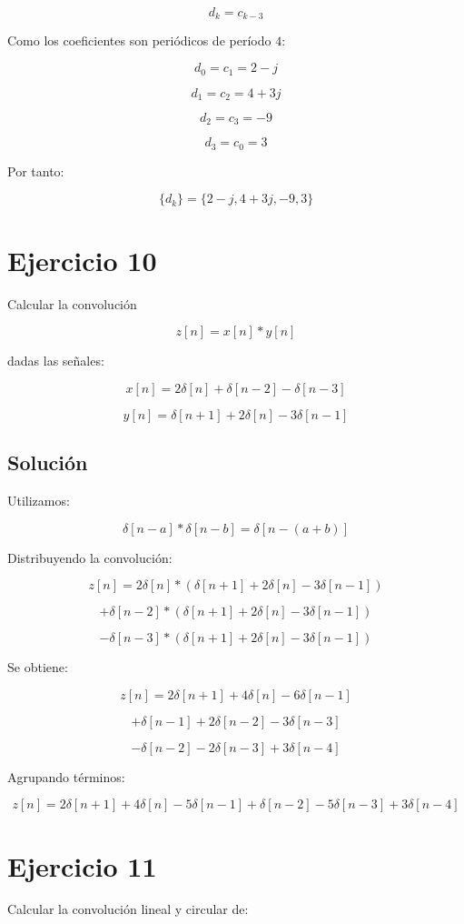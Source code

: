 \documentclass[fleqn]{article}
\begin{document}
	\[
	d_k=c_{k-3}
	\]

	Como los coeficientes son periódicos de período $4$:

	\[
	d_0=c_1=2-j
	\]

	\[
	d_1=c_2=4+3j
	\]

	\[
	d_2=c_3=-9
	\]

	\[
	d_3=c_0=3
	\]

	Por tanto:

	\[
	\boxed{
	\{d_k\}
	=
	\{2-j,4+3j,-9,3\}
	}
	\]

\section{Ejercicio 10}
	Calcular la convolución

	\[
	z[n]=x[n]*y[n]
	\]

	dadas las señales:

	\[
	x[n]
	=
	2\delta[n]
	+
	\delta[n-2]
	-
	\delta[n-3]
	\]

	\[
	y[n]
	=
	\delta[n+1]
	+
	2\delta[n]
	-
	3\delta[n-1]
	\]

	\subsection{Solución}

	Utilizamos:

	\[
	\delta[n-a]*\delta[n-b]
	=
	\delta[n-(a+b)]
	\]

	Distribuyendo la convolución:

	\[
	z[n]
	=
	2\delta[n]*
	\left(
	\delta[n+1]+2\delta[n]-3\delta[n-1]
	\right)
	\]

	\[
	+
	\delta[n-2]*
	\left(
	\delta[n+1]+2\delta[n]-3\delta[n-1]
	\right)
	\]

	\[
	-
	\delta[n-3]*
	\left(
	\delta[n+1]+2\delta[n]-3\delta[n-1]
	\right)
	\]

	Se obtiene:

	\[
	z[n]
	=
	2\delta[n+1]
	+
	4\delta[n]
	-
	6\delta[n-1]
	\]

	\[
	+
	\delta[n-1]
	+
	2\delta[n-2]
	-
	3\delta[n-3]
	\]

	\[
	-
	\delta[n-2]
	-
	2\delta[n-3]
	+
	3\delta[n-4]
	\]

	Agrupando términos:

	\[
	\boxed{
	z[n]
	=
	2\delta[n+1]
	+
	4\delta[n]
	-
	5\delta[n-1]
	+
	\delta[n-2]
	-
	5\delta[n-3]
	+
	3\delta[n-4]
	}
	\]

\section{Ejercicio 11}
	Calcular la convolución lineal y circular de:
\end{document}
